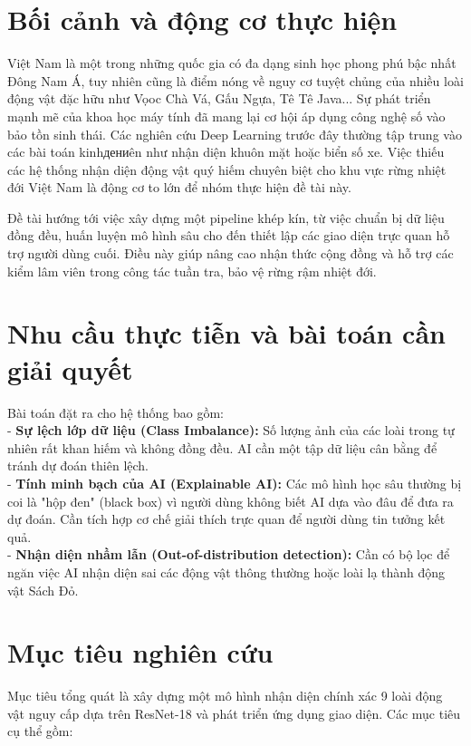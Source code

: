 \documentclass[12pt,a4paper]{report}
\begin{document}
\section{Bối cảnh và động cơ thực hiện}
Việt Nam là một trong những quốc gia có đa dạng sinh học phong phú bậc nhất Đông Nam Á, tuy nhiên cũng là điểm nóng về nguy cơ tuyệt chủng của nhiều loài động vật đặc hữu như Vọoc Chà Vá, Gấu Ngựa, Tê Tê Java... Sự phát triển mạnh mẽ của khoa học máy tính đã mang lại cơ hội áp dụng công nghệ số vào bảo tồn sinh thái. Các nghiên cứu Deep Learning trước đây thường tập trung vào các bài toán kinhдениên như nhận diện khuôn mặt hoặc biển số xe. Việc thiếu các hệ thống nhận diện động vật quý hiếm chuyên biệt cho khu vực rừng nhiệt đới Việt Nam là động cơ to lớn để nhóm thực hiện đề tài này.

Đề tài hướng tới việc xây dựng một pipeline khép kín, từ việc chuẩn bị dữ liệu đồng đều, huấn luyện mô hình sâu cho đến thiết lập các giao diện trực quan hỗ trợ người dùng cuối. Điều này giúp nâng cao nhận thức cộng đồng và hỗ trợ các kiểm lâm viên trong công tác tuần tra, bảo vệ rừng rậm nhiệt đới.

\section{Nhu cầu thực tiễn và bài toán cần giải quyết}
Bài toán đặt ra cho hệ thống bao gồm:\\

\noindent - \textbf{Sự lệch lớp dữ liệu (Class Imbalance):} Số lượng ảnh của các loài trong tự nhiên rất khan hiếm và không đồng đều. AI cần một tập dữ liệu cân bằng để tránh dự đoán thiên lệch.\\[0.15cm]
\noindent - \textbf{Tính minh bạch của AI (Explainable AI):} Các mô hình học sâu thường bị coi là "hộp đen" (black box) vì người dùng không biết AI dựa vào đâu để đưa ra dự đoán. Cần tích hợp cơ chế giải thích trực quan để người dùng tin tưởng kết quả.\\[0.15cm]
\noindent - \textbf{Nhận diện nhầm lẫn (Out-of-distribution detection):} Cần có bộ lọc để ngăn việc AI nhận diện sai các động vật thông thường hoặc loài lạ thành động vật Sách Đỏ.

\section{Mục tiêu nghiên cứu}
Mục tiêu tổng quát là xây dựng một mô hình nhận diện chính xác 9 loài động vật nguy cấp dựa trên ResNet-18 và phát triển ứng dụng giao diện. Các mục tiêu cụ thể gồm:\\
\end{document}
